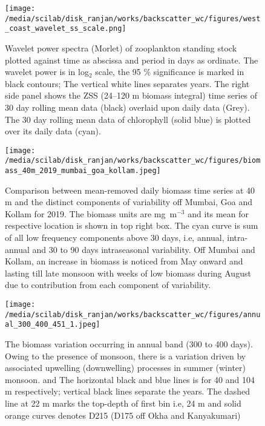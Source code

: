 \documentclass{article}
\begin{document}
\begin{figure}[htbp]
	\centering
	\texttt{[image: /media/scilab/disk\_ranjan/works/backscatter\_wc/figures/west\_coast\_wavelet\_ss\_scale.png]} 
	\captionsetup{justification=justified,font=footnotesize,skip=0.05\baselineskip,width=\textwidth}
	\caption{Wavelet power spectra (Morlet) of zooplankton standing stock plotted against time as abscissa and period in days as ordinate. The wavelet power is in log$_2$ scale, the 95 \% significance is marked in black contours; The vertical white lines separates years. The right side panel shows the ZSS (24--120 m biomass integral) time series of 30 day rolling mean data (black) overlaid upon daily data (Grey). The 30 day rolling mean data of chlorophyll (solid blue) is plotted over its daily data (cyan).}
	\label{fig:wavess}
\end{figure}

\begin{figure}[htbp]
	\centering
	\texttt{[image: /media/scilab/disk\_ranjan/works/backscatter\_wc/figures/biomass\_40m\_2019\_mumbai\_goa\_kollam.jpeg]} 
	\captionsetup{justification=justified,font=footnotesize,skip=0.05\baselineskip,width=\textwidth}
	\caption{Comparison between mean-removed daily biomass time series at 40 m and the distinct components of variability off Mumbai, Goa and Kollam for 2019. The biomass units are mg~m$^{-3}$ and its mean for respective location is shown in top right box.  The cyan curve is sum of all low frequency components above 30 days, i.e, annual, intra-annual and 30 to 90 days intraseasonal variability. Off Mumbai and Kollam, an increase in biomass is noticed from May onward and lasting till late monsoon with weeks of low biomass during August due to contribution from each component of variability.}
	\label{fig:variability}
\end{figure}


\begin{figure}[htbp]
	\centering
	\texttt{[image: /media/scilab/disk\_ranjan/works/backscatter\_wc/figures/annual\_300\_400\_451\_1.jpeg]} 
	\captionsetup{justification=justified,font=footnotesize,skip=0.05\baselineskip,width=\textwidth}
	\caption{The biomass variation occurring in annual band (300 to 400 days). Owing to the presence of monsoon, there is a variation driven by associated upwelling (downwelling) processes in summer (winter) monsoon. and The horizontal black and blue lines is for 40 and 104 m respectively; vertical black lines separate the years. The dashed line at 22 m marks the top-depth of first bin i.e, 24 m and solid orange curves denotes D215 (D175 off Okha and Kanyakumari)}
	\label{fig:annual}
\end{figure}
\end{document}
